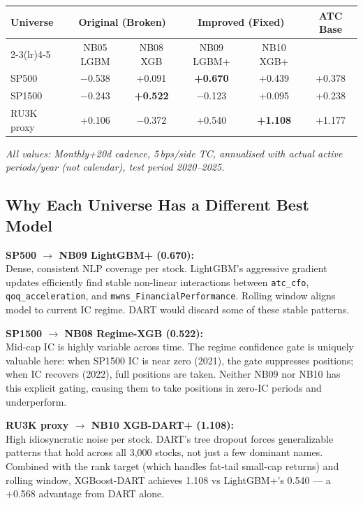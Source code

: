\documentclass[11pt,a4paper]{article}
\begin{document}
\begin{center}
\begin{tabular}{lccccc}
\toprule
\multirow{2}{*}{\textbf{Universe}} & \multicolumn{2}{c}{\textbf{Original (Broken)}} & \multicolumn{2}{c}{\textbf{Improved (Fixed)}} & \multirow{2}{*}{\textbf{ATC Base}}\\
\cmidrule(lr){2-3}\cmidrule(lr){4-5}
 & NB05 LGBM & NB08 XGB & NB09 LGBM+ & NB10 XGB+ & \\
\midrule
SP500      & $-$0.538 & +0.091 & \textbf{+0.670} & +0.439 & +0.378\\
SP1500     & $-$0.243 & \textbf{+0.522} & $-$0.123 & +0.095 & +0.238\\
RU3K proxy & +0.106 & $-$0.372 & +0.540 & \textbf{+1.108} & +1.177\\
\bottomrule
\end{tabular}
\end{center}

\textit{All values: Monthly+20d cadence, 5\,bps/side TC, annualised with actual active periods/year (not calendar), test period 2020--2025.}

\subsection{Why Each Universe Has a Different Best Model}

\begin{resultbox}
\textbf{SP500 $\to$ NB09 LightGBM+ (0.670):}\\
Dense, consistent NLP coverage per stock. LightGBM's aggressive gradient updates efficiently find stable non-linear interactions between \texttt{atc\_cfo}, \texttt{qoq\_acceleration}, and \texttt{mwns\_FinancialPerformance}. Rolling window aligns model to current IC regime. DART would discard some of these stable patterns.
\end{resultbox}

\begin{resultbox}
\textbf{SP1500 $\to$ NB08 Regime-XGB (0.522):}\\
Mid-cap IC is highly variable across time. The regime confidence gate is uniquely valuable here: when SP1500 IC is near zero (2021), the gate suppresses positions; when IC recovers (2022), full positions are taken. Neither NB09 nor NB10 has this explicit gating, causing them to take positions in zero-IC periods and underperform.
\end{resultbox}

\begin{resultbox}
\textbf{RU3K proxy $\to$ NB10 XGB-DART+ (1.108):}\\
High idiosyncratic noise per stock. DART's tree dropout forces generalizable patterns that hold across all 3{,}000 stocks, not just a few dominant names. Combined with the rank target (which handles fat-tail small-cap returns) and rolling window, XGBoost-DART achieves 1.108 vs LightGBM+'s 0.540 --- a +0.568 advantage from DART alone.
\end{resultbox}
\end{document}
